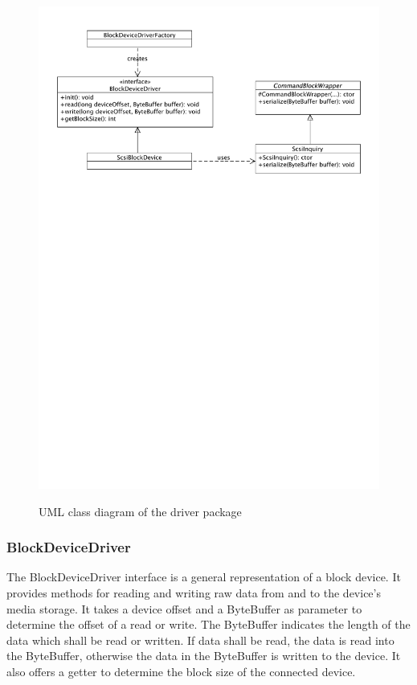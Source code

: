 \begin{figure}[h!]
\caption{UML class diagram of the driver package}
\centering
\includegraphics[scale=0.8]{figures/driver_package}
\label{figure:driver_package}
\end{figure}

\subsubsection{BlockDeviceDriver}

The BlockDeviceDriver interface is a general representation of a block device. It provides methods for reading and writing raw data from and to the device's media storage. It takes a device offset and a ByteBuffer as parameter to determine the offset of a read or write. The ByteBuffer indicates the length of the data which shall be read or written. If data shall be read, the data is read into the ByteBuffer, otherwise the data in the ByteBuffer is written to the device. It also offers a getter to determine the block size of the connected device.

